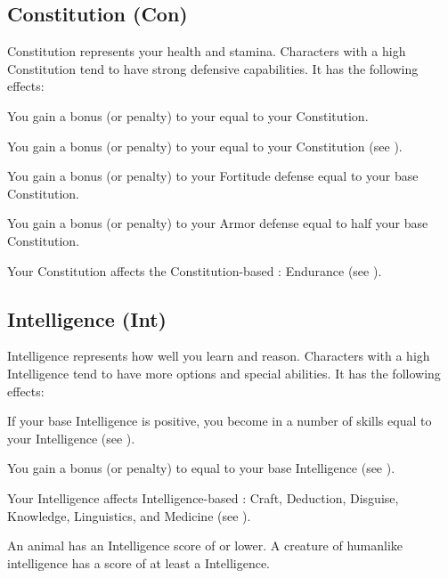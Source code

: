     \subsection{Constitution (Con)}\label{Constitution}
        {
            Constitution represents your health and stamina.
            Characters with a high Constitution tend to have strong defensive capabilities.
            It has the following effects:
            \begin{raggeditemize}
                \item You gain a bonus (or penalty) to your  equal to your Constitution.
                \item You gain a bonus (or penalty) to your  equal to your Constitution (see ).
                \item You gain a bonus (or penalty) to your Fortitude defense equal to your base Constitution.
                \item You gain a bonus (or penalty) to your Armor defense equal to half your base Constitution.
                \item Your Constitution affects the Constitution-based : Endurance (see ).
            \end{raggeditemize}
        }

    \subsection{Intelligence (Int)}\label{Intelligence}
        {
            Intelligence represents how well you learn and reason.
            Characters with a high Intelligence tend to have more options and special abilities.
            It has the following effects:

            \begin{raggeditemize}
                \item If your base Intelligence is positive, you become  in a number of skills equal to your Intelligence (see ).
                \item You gain a bonus (or penalty) to  equal to your base Intelligence (see ).
                \item Your Intelligence affects Intelligence-based : Craft, Deduction, Disguise, Knowledge, Linguistics, and Medicine (see ).
            \end{raggeditemize}

            \par An animal has an Intelligence score of  or lower.
            A creature of humanlike intelligence has a score of at least a  Intelligence.
        }

